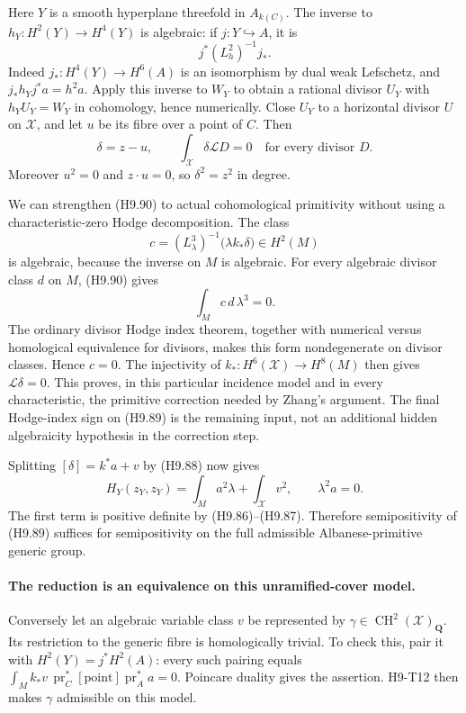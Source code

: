 \documentclass[11pt,a4paper]{article}
\begin{document}
Here $Y$ is a smooth hyperplane threefold in $A_{k(C)}$.
The inverse to $h_Y:H^2(Y)\to H^4(Y)$ is algebraic: if
$j:Y\hookrightarrow A$, it is
\[
                     j^*(L_h^2)^{-1}j_*.
\]
Indeed $j_*:H^4(Y)\to H^6(A)$ is an isomorphism by dual weak
Lefschetz, and $j_*h_Yj^*a=h^2a$. Apply this inverse to $W_Y$
to obtain a rational divisor $U_Y$ with
$h_YU_Y=W_Y$ in cohomology, hence numerically. Close $U_Y$ to
a horizontal divisor $U$ on $\mathcal X$, and let $u$ be its
fibre over a point of $C$. Then
\[
        \delta=z-u,\qquad
        \int_{\mathcal X}\delta\mathcal L D=0
                         \quad\text{for every divisor }D.  \tag{H9.90}
\]
Moreover $u^2=0$ and $z\cdot u=0$, so $\delta^2=z^2$ in degree.

We can strengthen (H9.90) to actual cohomological primitivity
without using a characteristic-zero Hodge decomposition. The
class
\[
       c=(L_\lambda^3)^{-1}\bigl(\lambda k_*\delta\bigr)
                                        \in H^2(M)
\]
is algebraic, because the inverse on $M$ is algebraic. For every
algebraic divisor class $d$ on $M$, (H9.90) gives
\[
                  \int_M c\,d\,\lambda^3=0.
\]
The ordinary divisor Hodge index theorem, together with numerical
versus homological equivalence for divisors, makes this form
nondegenerate on divisor classes. Hence $c=0$. The injectivity of
$k_*:H^6(\mathcal X)\to H^8(M)$ then gives
$\mathcal L\delta=0$.
This proves, in this particular incidence model and in every
characteristic, the primitive correction needed by Zhang's
argument. The final Hodge-index sign on (H9.89) is the remaining
input, not an additional hidden algebraicity hypothesis in the
correction step.

Splitting $[\delta]=k^*a+v$ by (H9.88) now gives
\[
 H_Y(z_Y,z_Y)
      =\int_M a^2\lambda+\int_{\mathcal X}v^2,
       \qquad \lambda^2a=0.                               \tag{H9.91}
\]
The first term is positive definite by (H9.86)--(H9.87).
Therefore semipositivity of (H9.89) suffices for semipositivity
on the full admissible Albanese-primitive generic group.

\paragraph{The reduction is an equivalence on this unramified-cover model.}
Conversely let an algebraic variable class $v$ be represented by
$\gamma\in\operatorname{CH}^2(\mathcal X)_{\mathbf Q}$.
Its restriction to the generic fibre is homologically trivial.
To check this, pair it with $H^2(Y)=j^*H^2(A)$: every such
pairing equals
$\int_Mk_*v\,\operatorname{pr}_C^*[\mathrm{point}]
                          \operatorname{pr}_A^*a=0$.
Poincare duality gives the assertion. H9-T12 then makes $\gamma$
admissible on this model.
\end{document}
